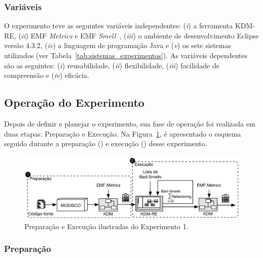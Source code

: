 \subsubsection{Variáveis}

O experimento teve as seguintes variáveis independentes: (\textit{i}) a ferramenta KDM-RE, (\textit{ii}) EMF \textit{Metrics} e EMF \textit{Smell}~\cite{Arendt_2012}, (\textit{iii}) o ambiente de desenvolvimento Eclipse versão 4.3.2, (\textit{iv}) a linguagem de programação Java e (\textit{v}) os sete sistemas utilizados (ver Tabela~\ref{tab:sistemas_experimentos}). As variáveis dependentes são as seguintes: (\textit{i}) reusabilidade, (\textit{ii}) flexibilidade, (\textit{iii}) facilidade de compreensão e (\textit{iv}) eficácia.

\subsection{Operação do Experimento}

Depois de definir e planejar o experimento, sua fase de operação foi realizada em duas etapas: Preparação e Execução. Na Figura~\ref{fig:execucao_experimento}, é apresentado o esquema seguido durante a preparação () e execução () desse experimento.

\begin{figure}[h]
	\centering
	\caption{Preparação e Execução ilustradas do Experimento 1.}
	\label{fig:execucao_experimento}
	\includegraphics[scale=0.9]{images/Figura_Experimento}
	\fautor
\end{figure}

\subsubsection{Preparação}

